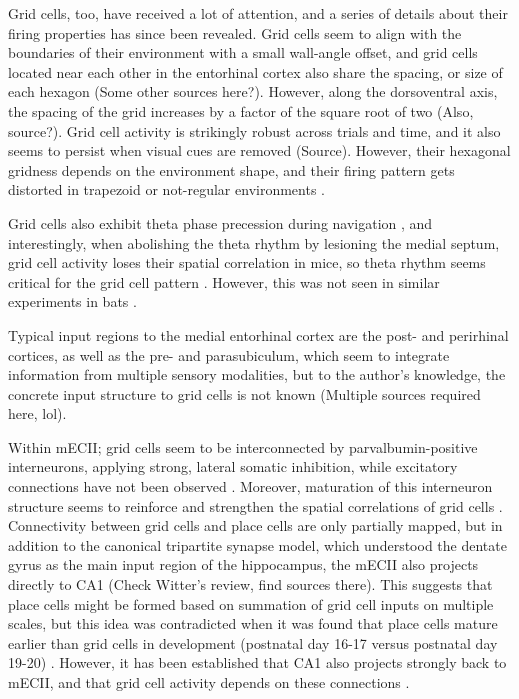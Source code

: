 \documentclass{article}
\begin{document}
    Grid cells, too, have received a lot of attention, and a series of details about their firing properties has since been revealed. Grid cells seem to align with the boundaries of their environment with a small wall-angle offset, and grid cells located near each other in the entorhinal cortex also share the spacing, or size of each hexagon (Some other sources here?). However, along the dorsoventral axis, the spacing of the grid increases by a factor of the square root of two (Also, source?). Grid cell activity is strikingly robust across trials and time, and it also seems to persist when visual cues are removed (Source). However, their hexagonal gridness depends on the environment shape, and their firing pattern gets distorted in trapezoid or not-regular environments \parencite{Stensola2015,Krupic2015}.

    Grid cells also exhibit theta phase precession during navigation \parencite{Hafting2008}, and interestingly, when abolishing the theta rhythm by lesioning the medial septum, grid cell activity loses their spatial correlation in mice, so theta rhythm seems critical for the grid cell pattern \parencite{Brandon2011,Koenig2011}. However, this was not seen in similar experiments in bats \parencite{Yartsev2011}.

    Typical input regions to the medial entorhinal cortex are the post- and perirhinal cortices, as well as the pre- and parasubiculum, which seem to integrate information from multiple sensory modalities, but to the author's knowledge, the concrete input structure to grid cells is not known (Multiple sources required here, lol).

    Within mECII; grid cells seem to be interconnected by parvalbumin-positive interneurons, applying strong, lateral somatic inhibition, while excitatory connections have not been observed \parencite{Couey2013,Buetfering2014}. Moreover, maturation of this interneuron structure seems to reinforce and strengthen the spatial correlations of grid cells \parencite{Christensen2021}. 
    Connectivity between grid cells and place cells are only partially mapped, but in addition to the canonical tripartite synapse model, which understood the dentate gyrus as the main input region of the hippocampus, the mECII also projects directly to CA1 (Check Witter’s review, find sources there). This suggests that place cells might be formed based on summation of grid cell inputs on multiple scales, but this idea was contradicted when it was found that place cells mature earlier than grid cells in development (postnatal day 16-17 versus postnatal day 19-20) \parencite{Langston2010,Wills2010,Wills2012}. However, it has been established that CA1 also projects strongly back to mECII, and that grid cell activity depends on these connections \parencite{Bonnevie2013}.
\end{document}
